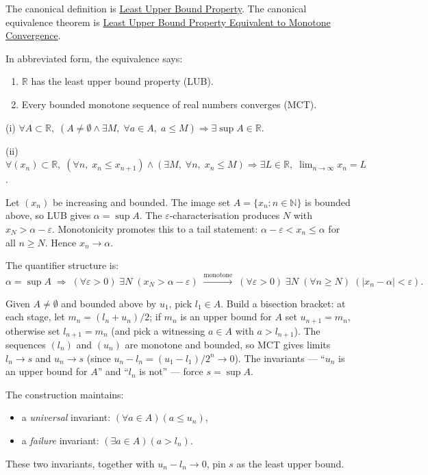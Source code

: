 \begin{remark*}[Interpretation]
The canonical definition is
\hyperref[def:least-upper-bound-property]{Least Upper Bound Property}. The
canonical equivalence theorem is
\hyperref[thm:lub-property-equivalent-monotone-convergence]{Least Upper Bound
Property Equivalent to Monotone Convergence}.

In abbreviated form, the equivalence says:
\begin{enumerate}[label=(\roman*)]
  \item $\mathbb{R}$ has the least upper bound property (LUB).
  \item Every bounded monotone sequence of real numbers converges (MCT).
\end{enumerate}
\end{remark*}

\begin{remark}
(i) $\forall A\subset\mathbb{R},\;
    (A\neq\emptyset\land\exists M,\;\forall a\in A,\;a\leq M)
    \Rightarrow\exists\sup A\in\mathbb{R}$.

(ii) $\forall(x_n)\subset\mathbb{R},\;
    (\forall n,\;x_n\leq x_{n+1})\land(\exists M,\;\forall n,\;x_n\leq M)
    \Rightarrow\exists L\in\mathbb{R},\;\lim_{n\to\infty}x_n=L$.
\end{remark}

\begin{remark}
Let $(x_n)$ be increasing and bounded. The image set $A=\{x_n:n\in\mathbb{N}\}$
is bounded above, so LUB gives $\alpha=\sup A$. The
$\varepsilon$-characterisation produces $N$ with $x_N>\alpha-\varepsilon$.
Monotonicity promotes this to a tail statement: $\alpha-\varepsilon<x_n\leq\alpha$
for all $n\geq N$. Hence $x_n\to\alpha$.

The quantifier structure is:
\[
  \alpha=\sup A
  \;\Rightarrow\;
  (\forall\varepsilon>0)\;\exists N\;(x_N>\alpha-\varepsilon)
  \;\xrightarrow{\text{monotone}}\;
  (\forall\varepsilon>0)\;\exists N\;(\forall n\geq N)\;(|x_n-\alpha|<\varepsilon).
\]
\end{remark}

\begin{remark}
Given $A\neq\emptyset$ and bounded above by $u_1$, pick $l_1\in A$.
Build a bisection bracket: at each stage, let $m_n=(l_n+u_n)/2$; if $m_n$
is an upper bound for $A$ set $u_{n+1}=m_n$, otherwise set $l_{n+1}=m_n$
(and pick a witnessing $a\in A$ with $a>l_{n+1}$). The sequences $(l_n)$
and $(u_n)$ are monotone and bounded, so MCT gives limits
$l_n\to s$ and $u_n\to s$ (since $u_n-l_n=(u_1-l_1)/2^n\to 0$). The
invariants --- ``$u_n$ is an upper bound for $A$'' and ``$l_n$ is not'' ---
force $s=\sup A$.

\medskip
The construction maintains:
\begin{itemize}
  \item a \emph{universal} invariant: $(\forall a\in A)(a\leq u_n)$,
  \item a \emph{failure} invariant: $(\exists a\in A)(a>l_n)$.
\end{itemize}
These two invariants, together with $u_n-l_n\to 0$, pin $s$ as the least
upper bound.
\end{remark}

